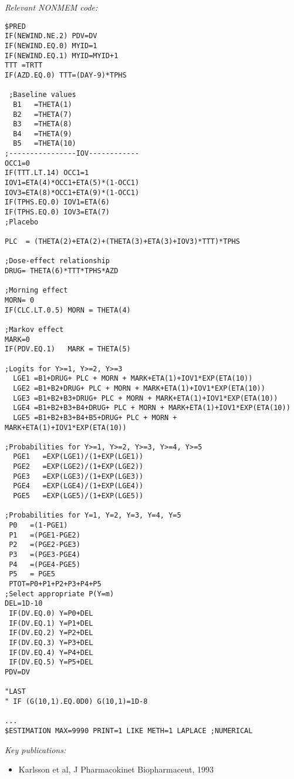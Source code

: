\documentclass[a4paper,11pt]{article}
\begin{document}
\vspace{10pt}

\noindent \emph{Relevant NONMEM code:}
\begin{lstlisting}
$PRED
IF(NEWIND.NE.2) PDV=DV
IF(NEWIND.EQ.0) MYID=1
IF(NEWIND.EQ.1) MYID=MYID+1
TTT =TRTT
IF(AZD.EQ.0) TTT=(DAY-9)*TPHS

 ;Baseline values
  B1   =THETA(1)
  B2   =THETA(7)
  B3   =THETA(8)
  B4   =THETA(9)
  B5   =THETA(10)
;----------------IOV------------
OCC1=0
IF(TTT.LT.14) OCC1=1
IOV1=ETA(4)*OCC1+ETA(5)*(1-OCC1)
IOV3=ETA(8)*OCC1+ETA(9)*(1-OCC1)
IF(TPHS.EQ.0) IOV1=ETA(6)
IF(TPHS.EQ.0) IOV3=ETA(7)
;Placebo 

PLC  = (THETA(2)+ETA(2)+(THETA(3)+ETA(3)+IOV3)*TTT)*TPHS 

;Dose-effect relationship
DRUG= THETA(6)*TTT*TPHS*AZD 

;Morning effect 
MORN= 0 
IF(CLC.LT.0.5) MORN = THETA(4)

;Markov effect
MARK=0
IF(PDV.EQ.1)   MARK = THETA(5)

;Logits for Y>=1, Y>=2, Y>=3
  LGE1 =B1+DRUG+ PLC + MORN + MARK+ETA(1)+IOV1*EXP(ETA(10))
  LGE2 =B1+B2+DRUG+ PLC + MORN + MARK+ETA(1)+IOV1*EXP(ETA(10))
  LGE3 =B1+B2+B3+DRUG+ PLC + MORN + MARK+ETA(1)+IOV1*EXP(ETA(10))
  LGE4 =B1+B2+B3+B4+DRUG+ PLC + MORN + MARK+ETA(1)+IOV1*EXP(ETA(10))
  LGE5 =B1+B2+B3+B4+B5+DRUG+ PLC + MORN + MARK+ETA(1)+IOV1*EXP(ETA(10))

;Probabilities for Y>=1, Y>=2, Y>=3, Y>=4, Y>=5
  PGE1   =EXP(LGE1)/(1+EXP(LGE1))
  PGE2   =EXP(LGE2)/(1+EXP(LGE2))
  PGE3   =EXP(LGE3)/(1+EXP(LGE3))
  PGE4   =EXP(LGE4)/(1+EXP(LGE4))
  PGE5   =EXP(LGE5)/(1+EXP(LGE5))

;Probabilities for Y=1, Y=2, Y=3, Y=4, Y=5
 P0   =(1-PGE1) 
 P1   =(PGE1-PGE2)
 P2   =(PGE2-PGE3)
 P3   =(PGE3-PGE4)
 P4   =(PGE4-PGE5)
 P5   = PGE5   
 PTOT=P0+P1+P2+P3+P4+P5
;Select appropriate P(Y=m)
DEL=1D-10
 IF(DV.EQ.0) Y=P0+DEL
 IF(DV.EQ.1) Y=P1+DEL
 IF(DV.EQ.2) Y=P2+DEL
 IF(DV.EQ.3) Y=P3+DEL
 IF(DV.EQ.4) Y=P4+DEL
 IF(DV.EQ.5) Y=P5+DEL
PDV=DV

"LAST                     
" IF (G(10,1).EQ.0D0) G(10,1)=1D-8

...
$ESTIMATION MAX=9990 PRINT=1 LIKE METH=1 LAPLACE ;NUMERICAL
\end{lstlisting}

\noindent \emph{Key publications:}
\begin{itemize}
\item Karlsson et al, J Pharmacokinet Biopharmaceut, 1993
\end{itemize}
\end{document}
